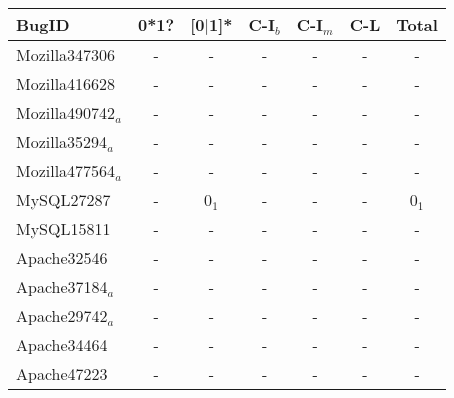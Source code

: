 \begin{table}
  \centering
  \scriptsize
  \newcommand{\Yes}[0]{\checkmark}
  \newcommand{\No}[0]{-}
  \begin{tabular}{lcccccc}
    \toprule
   {\bf BugID}           &  {\bf 0*1?}          &  {\bf [0$|$1]*}             &{\bf C-I$_b$}            &{\bf C-I$_m$}          &   {\bf C-L}     & {\bf Total}  \\
   \midrule
   Mozilla347306         &   -                  & -                           & -                       & -                     &   -             & -\\
   Mozilla416628         &   -                  & -                           & -                       & -                     &   -             & -\\
   Mozilla490742$_a$     &   -                  & -                           & -                       & -                     &   -             & -\\
   Mozilla35294$_a$      &   -                  & -                           & -                       & -                     &   -             & -\\ 
   Mozilla477564$_a$     &   -                  & -                           & -                       & -                     &   -             & -\\
   \midrule 
   MySQL27287            &   -                  & 0$_1$                       & -                       & -                     &   -             & 0$_1$\\
   MySQL15811            &   -                  & -                           & -                       & -                     &   -             & -\\ 
   \midrule    
   Apache32546           &   -                  & -                           & -                       & -                     &   -             & -\\
   Apache37184$_a$       &   -                  & -                           & -                       & -                     &   -             & -\\
   Apache29742$_a$       &   -                  & -                           & -                       & -                     &   -             & -\\ 
   Apache34464           &   -                  & -                           & -                       & -                     &   -             & -\\
   Apache47223           &   -                  & -                           & -                       & -                     &   -             & -\\

\end{tabular}
\end{table}
